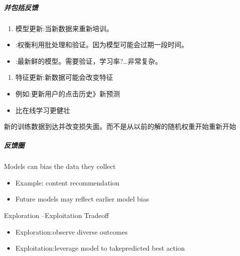 \documentclass[letterpaper,10pt,english]{sphinxmanual}
\begin{document}
\subparagraph{并包括反馈}
\label{\detokenize{chapter_project/Model Process:id9}}\begin{enumerate}
%
\item {} 
模型更新:当新数据来重新培训。

\end{enumerate}
\begin{itemize}
\item {} 
:权衡利用批处理和验证。因为模型可能会过期一段时间。

\item {} 
:最新鲜的模型。需要验证，学习率?…非常复杂。

\end{itemize}
\begin{enumerate}
%
\setcounter{enumi}{1}
\item {} 
特征更新:新数据可能会改变特征

\end{enumerate}
\begin{itemize}
\item {} 
例如:更新用户的点击历史\sphinxhyphen{}》新预测

\item {} 
比在线学习更健壮

\end{itemize}

新的训练数据到达并改变损失面。而不是从以前的解的随机权重开始重新开始


\subparagraph{反馈圈}
\label{\detokenize{chapter_project/Model Process:id10}}
Models can bias the data they collect
\begin{itemize}
\item {} 
Example: content recommendation

\item {} 
Future models may reflect earlier model bias

\end{itemize}

Exploration –Exploitation Trade\sphinxhyphen{}off
\begin{itemize}
\item {} 
Exploration:observe diverse outcomes

\item {} 
Exploitation:leverage model to takepredicted best action

\end{itemize}
\end{document}
